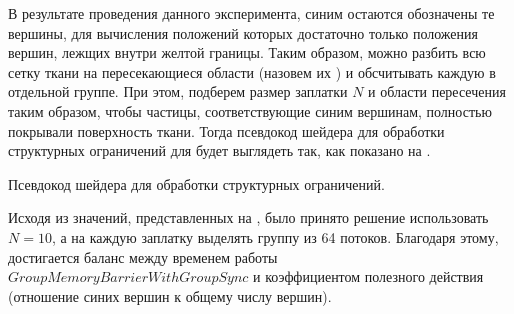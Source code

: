 	В результате проведения данного эксперимента, синим остаются обозначены те вершины, для вычисления положений которых достаточно только положения вершин, лежщих внутри желтой границы. Таким образом, можно разбить всю сетку ткани на пересекающиеся области (назовем их ) и обсчитывать каждую  в отдельной группе. При этом, подберем размер заплатки $N$ и области пересечения таким образом, чтобы частицы, соответствующие синим вершинам, полностью покрывали поверхность ткани. Тогда псевдокод шейдера для обработки структурных ограничений для  будет выглядеть так, как показано на .
	
	\begin{algorithm} [h]
		\nonl{}
	\caption{Псевдокод шейдера для обработки структурных ограничений.}\label{alg:structuralChunk}
	\end{algorithm}
	
	Исходя из значений, представленных на , было принято решение использовать $N=10$, а на каждую заплатку выделять группу из 64 потоков. Благодаря этому, достигается баланс между временем работы $GroupMemoryBarrierWithGroupSync$ и коэффициентом полезного действия (отношение синих вершин к общему числу вершин).
	
